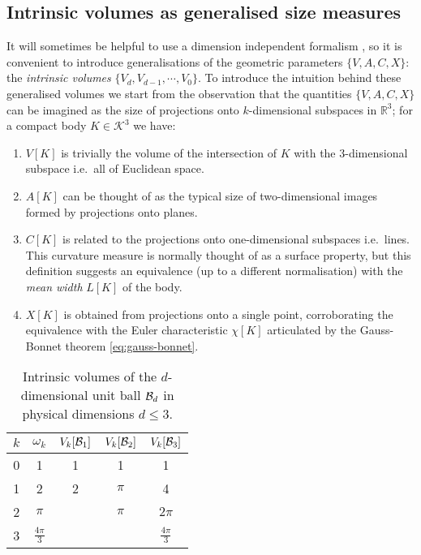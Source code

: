 \subsection{Intrinsic volumes as generalised size measures}
\label{sec:generalised-intrinsic-volumes-d}

It will sometimes be helpful to use a dimension independent formalism%
,
so it is convenient to introduce generalisations of the geometric parameters $\{V,A,C,X\}$: the \emph{intrinsic volumes} $\{V_d, V_{d-1}, \cdots, V_0\}$.
To introduce the intuition behind these generalised volumes we start from the observation that the quantities $\{V,A,C,X\}$ can be imagined as the size of projections onto $k$-dimensional subspaces in $\mathbb{R}^3$; for a compact body $K \in \mathcal{K}^3$ we have:
\begin{enumerate}
\item $V[K]$ is trivially the volume of the intersection of $K$ with the 3-dimensional subspace i.e.\ all of Euclidean space.
\item $A[K]$ can be thought of as the typical size of two-dimensional images formed by projections onto planes.
\item $C[K]$ is related to the projections onto one-dimensional subspaces i.e.\ lines.
  This curvature measure is normally thought of as a surface property, but this definition suggests an equivalence (up to a different normalisation) with the \emph{mean width} $L[K]$ of the body.
\item $X[K]$ is obtained from projections onto a single point, corroborating the equivalence with the Euler characteristic $\chi[K]$ articulated by the Gauss-Bonnet theorem \eqref{eq:gauss-bonnet}.
\end{enumerate}

\begin{SCtable}
  \begin{minipage}[b]{\linewidth}
    \centering
    \begin{tabular}{ccccc}
      \toprule
      $k$ & $\omega_k$ & $V_k[\mathcal{B}_1]$ & $V_k[\mathcal{B}_2]$ & $V_k[\mathcal{B}_3]$ \\
      \midrule
      0 & 1 & 1 & 1 & 1 \\
      1 & 2 & 2 & $\pi$ & 4 \\
      2 & $\pi$ && $\pi$ & $2\pi$ \\
      3 & $\frac{4\pi}{3}$ &&& $\frac{4\pi}{3}$ \\
      \bottomrule
    \end{tabular}
  \end{minipage}
  \caption{Intrinsic volumes of the $d$-dimensional unit ball $\mathcal{B}_d$ in physical dimensions $d \le 3$.}
  \label{table:ball-intrinsic-volumes}
\end{SCtable}

